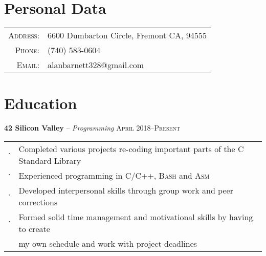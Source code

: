 \documentclass[letterpaper,12pt]{article}
\begin{document}
\pagestyle{empty} %

\par{\bigskip\par}

\section{Personal Data}

\begin{tabular}{rl}
\textsc{Address:} & 6600 Dumbarton Circle, Fremont CA, 94555 \\
\textsc{Phone:} & (740) 583-0604 \\
\textsc{Email:} & alanbarnett328@gmail.com
\end{tabular}

\section{Education}

\textbf{42 Silicon Valley} -- \textit{Programming} \hfill \textsc{April 2018--Present}

\begin{tabular}{rl}
$\cdot$ & Completed various projects re-coding important parts of the C Standard Library \\
$\cdot$ & Experienced programming in \textsc{C/C++, Bash} and \textsc{Asm} \\
$\cdot$ & Developed interpersonal skills through group work and peer corrections \\
$\cdot$ & Formed solid time management and motivational skills by having to create \\
		& my own schedule and work with project deadlines \\
\end{tabular}
\end{document}
